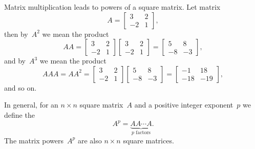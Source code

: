 \begin{example} \label{eg:}
Matrix multiplication leads to powers of a square matrix.
Let matrix
\begin{equation*}
A=\begin{bmatrix} 3&2\\-2&1 \end{bmatrix},
\end{equation*}
then by~\(A^2\) we mean the product
\begin{equation*}
AA=\begin{bmatrix} 3&2\\-2&1 \end{bmatrix}\begin{bmatrix} 3&2\\-2&1 \end{bmatrix}=\begin{bmatrix} 5&8\\-8&-3 \end{bmatrix},
\end{equation*}
and by~\(A^3\) we mean the product
\begin{equation*}
AAA=AA^2=\begin{bmatrix} 3&2\\-2&1 \end{bmatrix}
\begin{bmatrix} 5&8\\-8&-3 \end{bmatrix}
=\begin{bmatrix} -1&18\\-18&-19 \end{bmatrix},
\end{equation*}
and so on.
\end{example}

In general, for an \(n\times n\) square matrix~\(A\) and a positive integer exponent~\(p\) we define the 
\begin{equation*}
A^p=\underbrace{AA\cdots A}_{p\text{ factors}}.
\end{equation*}
The matrix powers~\(A^p\) are also \(n\times n\) square matrices.


